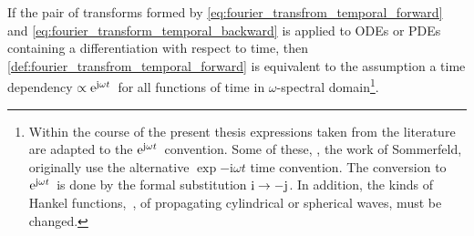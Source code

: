 \begin{remark}\label{rem:time_convention}
	If the pair of transforms formed by
	\eqref{eq:fourier_transfrom_temporal_forward} and
	\eqref{eq:fourier_transform_temporal_backward} is applied to \acp{ODE}
	or \acp{PDE} containing a differentiation with respect to time, then
	\cref{def:fourier_transfrom_temporal_forward} is equivalent to the
	assumption a time dependency $\propto\mathrm{e}^{\mathrm{j} \omega t}\,$ for all
	functions of time in $\omega$-spectral domain\footnote{Within the course of
	the present thesis expressions taken from the literature are adapted to the
	$\mathrm{e}^{\mathrm{j} \omega t}\,$ convention. Some of these, \eg, the work of
	Sommerfeld, originally use the alternative $\exp{-\mathrm{i} \omega t}$
	time convention.
	The conversion to $\mathrm{e}^{\mathrm{j} \omega t}\,$ is done by the formal substitution
	$\mathrm{i} \to -\mathrm{j}$. In addition, the kinds of Hankel functions,~\ie,
	of propagating cylindrical or spherical waves, must be changed.}.
\end{remark}

